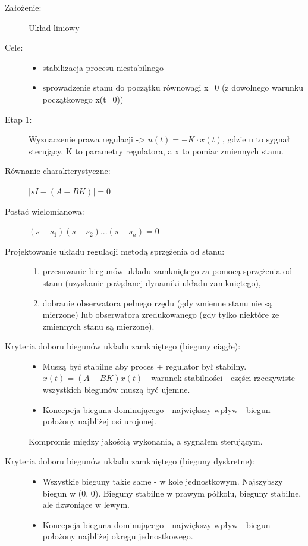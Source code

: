 \begin{description}
    \item[Założenie:] Układ liniowy
    \item[Cele:]\mbox{}
    \begin{itemize}
        \item stabilizacja procesu niestabilnego
        \item sprowadzenie stanu do początku równowagi x=0 (z dowolnego warunku początkowego x(t=0))
    \end{itemize}
    \item[Etap 1:] Wyznaczenie prawa regulacji -> $u(t) = -K\cdot{}x(t)$, gdzie u to sygnał sterujący, K to parametry regulatora, a x to pomiar zmiennych stanu.
    \item[Równanie charakterystyczne:] $|sI-(A-BK)|=0$
    \item[Postać wielomianowa:] $(s-s_1)(s-s_2)...(s-s_n)=0$
    \item[Projektowanie układu regulacji metodą sprzężenia od stanu:]\mbox{}
    \begin{enumerate}
        \item przesuwanie biegunów układu zamkniętego za pomocą sprzężenia od stanu (uzyskanie pożądanej dynamiki układu zamkniętego),
        \item dobranie obserwatora pełnego rzędu (gdy zmienne stanu nie są mierzone) lub obserwatora zredukowanego (gdy tylko niektóre ze zmiennych stanu są mierzone).
    \end{enumerate}
    \item[Kryteria doboru biegunów układu zamkniętego (bieguny ciągłe):]\mbox{}
    \begin{itemize}
        \item Muszą być stabilne aby proces + regulator był stabilny.\\ $\dot{x}(t) = (A-BK)x(t)$ - warunek stabilności - części rzeczywiste wszystkich biegunów muszą być ujemne.
        \item Koncepcja bieguna dominującego - największy wpływ - biegun położony najbliżej osi urojonej.
    \end{itemize}\mbox{}
    Kompromis między jakością wykonania, a sygnałem sterującym.
    \item[Kryteria doboru biegunów układu zamkniętego (bieguny dyskretne):]\mbox{}
    \begin{itemize}
        \item Wszystkie bieguny takie same - w kole jednostkowym. Najszybszy biegun w (0, 0). Bieguny stabilne w prawym półkolu, bieguny stabilne, ale dzwoniące w lewym.
        \item Koncepcja bieguna dominującego - największy wpływ - biegun położony najbliżej okręgu jednostkowego.
    \end{itemize}
\end{description}

